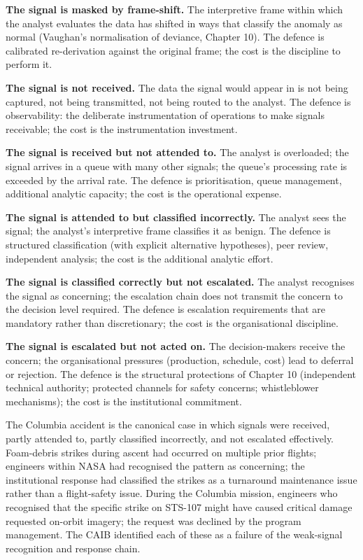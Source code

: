 \textbf{The signal is masked by frame-shift.} The interpretive frame within which the analyst evaluates the data has shifted in ways that classify the anomaly as normal (Vaughan's normalisation of deviance, Chapter 10). The defence is calibrated re-derivation against the original frame; the cost is the discipline to perform it.

\textbf{The signal is not received.} The data the signal would appear in is not being captured, not being transmitted, not being routed to the analyst. The defence is observability: the deliberate instrumentation of operations to make signals receivable; the cost is the instrumentation investment.

\textbf{The signal is received but not attended to.} The analyst is overloaded; the signal arrives in a queue with many other signals; the queue's processing rate is exceeded by the arrival rate. The defence is prioritisation, queue management, additional analytic capacity; the cost is the operational expense.

\textbf{The signal is attended to but classified incorrectly.} The analyst sees the signal; the analyst's interpretive frame classifies it as benign. The defence is structured classification (with explicit alternative hypotheses), peer review, independent analysis; the cost is the additional analytic effort.

\textbf{The signal is classified correctly but not escalated.} The analyst recognises the signal as concerning; the escalation chain does not transmit the concern to the decision level required. The defence is escalation requirements that are mandatory rather than discretionary; the cost is the organisational discipline.

\textbf{The signal is escalated but not acted on.} The decision-makers receive the concern; the organisational pressures (production, schedule, cost) lead to deferral or rejection. The defence is the structural protections of Chapter 10 (independent technical authority; protected channels for safety concerns; whistleblower mechanisms); the cost is the institutional commitment.

The Columbia accident \cite{acc:caib-columbia} is the canonical case in which signals were received, partly attended to, partly classified incorrectly, and not escalated effectively. Foam-debris strikes during ascent had occurred on multiple prior flights; engineers within NASA had recognised the pattern as concerning; the institutional response had classified the strikes as a turnaround maintenance issue rather than a flight-safety issue. During the Columbia mission, engineers who recognised that the specific strike on STS-107 might have caused critical damage requested on-orbit imagery; the request was declined by the program management. The CAIB identified each of these as a failure of the weak-signal recognition and response chain.

